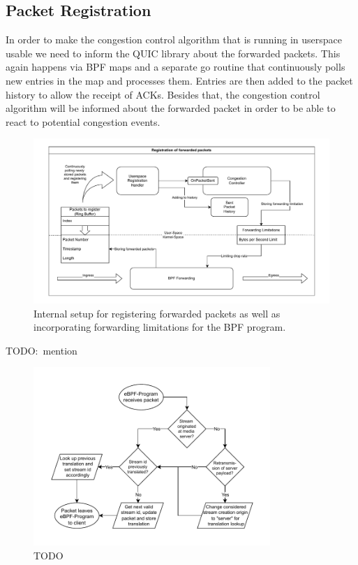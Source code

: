 \subsection{Packet Registration}
In order to make the congestion control algorithm that is running in userspace
usable we need to inform the QUIC library about the forwarded packets.
This again happens via BPF maps and a separate go routine that continuously
polls new entries in the map and processes them.
Entries are then added to the packet history to allow the receipt of ACKs.
Besides that, the congestion control algorithm will be informed about the
forwarded packet in order to be able to react to potential congestion events.
\begin{figure}[htbp]
    \centering
    \includegraphics[width=\textwidth]{figures/03_fast_relays/forward-registration.drawio.pdf}
    \caption{Internal setup for registering forwarded packets as well as incorporating forwarding
    limitations for the BPF program.}\label{fig:forward-registration}
\end{figure}



TODO:~mention
\begin{figure}[htbp]
    \centering
    \includegraphics[width=0.8\textwidth]{figures/03_fast_relays/stream-id-translation.drawio.pdf}
    \caption{TODO}\label{fig:stream-id-translation}
\end{figure}